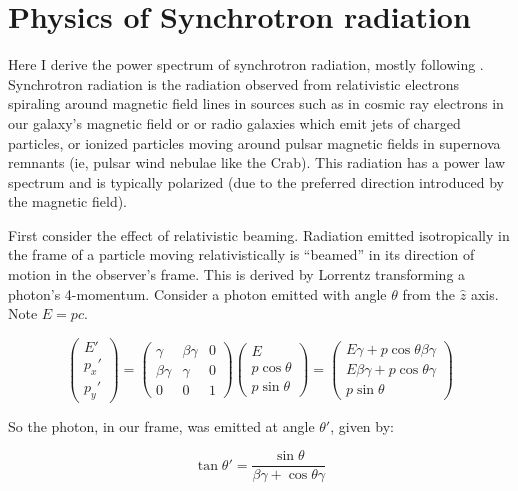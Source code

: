 
\chapter{Physics of Synchrotron radiation}
\label{chap:synchrotron}

Here I derive the power spectrum of synchrotron radiation, mostly following \citet{choudhuri2010astrophysics}. Synchrotron radiation is the radiation observed from relativistic electrons spiraling around magnetic field lines in sources such as in cosmic ray electrons in our galaxy's magnetic field or  or radio galaxies which emit jets of charged particles, or ionized particles moving around pulsar magnetic fields in supernova remnants (ie, pulsar wind nebulae like the Crab). This radiation has a power law spectrum and is typically polarized (due to the preferred direction introduced by the magnetic field). 

First consider the effect of relativistic beaming. Radiation emitted isotropically in the frame of a particle moving relativistically is ``beamed'' in its direction of motion in the observer's frame. This is derived by Lorrentz transforming a photon's 4-momentum. Consider a photon emitted with angle $\theta$ from the $\hat{z}$ axis. Note $E=pc$.

\begin{equation}
\left(\begin{matrix}
E'\\
p_x'\\
p_y'
\end{matrix}\right)=
\left(\begin{matrix}
\gamma&\beta\gamma& 0\\
\beta\gamma&\gamma &0\\
0&0 &1
\end{matrix}\right)
\left(\begin{matrix}
E\\
p\cos\theta\\
p\sin\theta
\end{matrix}\right)=
\left(\begin{matrix}
E\gamma+p\cos\theta\beta\gamma\\
E\beta\gamma+p\cos\theta\gamma\\
p\sin\theta
\end{matrix}\right)
\end{equation}

So the photon, in our frame, was emitted at angle $\theta'$, given by:

\begin{equation}
\tan\theta'=\frac{\sin\theta}{\beta\gamma+\cos\theta\gamma}
\end{equation}

